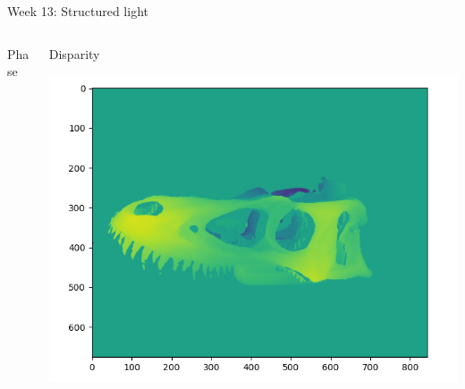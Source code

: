 \documentclass[aspectratio=169,hyperref={pdfpagelabels=false}]{beamer}
\begin{document}
\begin{frame}{ Week 13: Structured light }
\begin{columns}
\begin{column}{.3\textwidth}
\begin{block}{Phase}
			\end{block}
		\end{column}
		\begin{column}{.3\textwidth}
			\begin{block}{Disparity}
				\begin{center}
					\includegraphics[width=\textwidth]{exercise_imgs/ex13-4.png}
				\end{center}
			\end{block}
		\end{column}
	\end{columns}
\end{frame}
\end{document}
